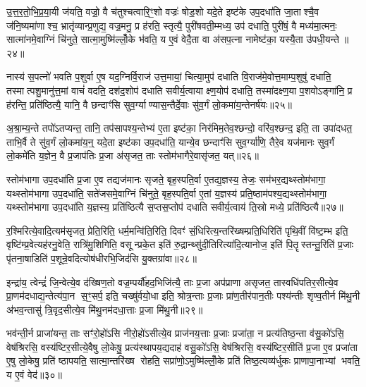 उ॒त्त॒र॒तो॒भि॒प्र॒या॒यी ज॑यति॒ वज्रो॒ वै च॑तुश्चत्वारि॒ꣳ॒शो वज्रः॑ षोड॒शो यदे॒ते इष्ट॑के उप॒दधा॑ति जा॒ताश्चै॒व ज॑नि॒ष्यमा॑णाश्च॒ भ्रातृ॑व्यान्प्र॒णुद्य॒ वज्र॒मनु॒ प्र ह॑रति॒ स्तृत्यै॒ पुरी॑षवती॒म्मध्य॒ उप॑ दधाति॒ पुरी॑षं॒ वै मध्य॑मा॒त्मनः॒ सात्मा॑नमे॒वाग्निं चि॑नुते॒ सात्मा॒मुष्मि॑ल्लोँ॒के भ॑वति॒ य ए॒वं वेदै॒ता वा अ॑सप॒त्ना नामेष्ट॑का॒ यस्यै॒ता उ॑पधी॒यन्ते॥२४॥

नास्य॑ स॒पत्नो॑ भवति प॒शुर्वा ए॒ष यद॒ग्निर्वि॒राज॑ उत्त॒मायां॒ चित्या॒मुप॑ दधाति वि॒राज॑मे॒वोत्त॒माम्प॒शुषु॑ दधाति॒ तस्मात्पशु॒मानु॑त्त॒मां वाचं॑ वदति॒ दश॑द॒शोप॑ दधाति सवीर्य॒त्वायाक्ष्ण॒योप॑ दधाति॒ तस्मा॑दक्ष्ण॒या प॒शवोऽङ्गा॑नि॒ प्र ह॑रन्ति॒ प्रति॑ष्ठित्यै॒ यानि॒ वै छन्दाꣳ॑सि सुव॒र्ग्याण्यास॒न्तैर्दे॒वाः सु॑व॒र्गं लो॒कमा॑य॒न्तेनर्\mbox{}ष॑यः॥२५॥

अ॒श्रा॒म्य॒न्ते तपो॑ऽतप्यन्त॒ तानि॒ तप॑सापश्य॒न्तेभ्य॑ ए॒ता इष्ट॑का॒ निर॑मिम॒तेव॒श्छन्दो॒ वरि॑व॒श्छन्द॒ इति॒ ता उपा॑दधत॒ ताभि॒र्वै ते सु॑व॒र्गं लो॒कमा॑य॒न्॒ यदे॒ता इष्ट॑का उप॒दधा॑ति॒ यान्ये॒व छन्दाꣳ॑सि सुव॒र्ग्या॑णि॒ तैरे॒व यज॑मानः सुव॒र्गं लो॒कमे॑ति य॒ज्ञेन॒ वै प्र॒जाप॑तिः प्र॒जा अ॑सृजत॒ ताः स्तोम॑भागैरे॒वासृ॑जत॒ यत्॥२६॥

स्तोम॑भागा उप॒दधा॑ति प्र॒जा ए॒व तद्यज॑मानः सृजते॒ बृह॒स्पति॒र्वा ए॒तद्य॒ज्ञस्य॒ तेजः॒ सम॑भर॒द्यथ्स्तोम॑भागा॒ यथ्स्तोम॑भागा उप॒दधा॑ति॒ सते॑जसमे॒वाग्निं चि॑नुते॒ बृह॒स्पति॒र्वा ए॒तां य॒ज्ञस्य॑ प्रति॒ष्ठाम॑पश्य॒द्यथ्स्तोम॑भागा॒ यथ्स्तोम॑भागा उप॒दधा॑ति य॒ज्ञस्य॒ प्रति॑ष्ठित्यै स॒प्तस॒प्तोप॑ दधाति सवीर्य॒त्वाय॑ ति॒स्रो मध्ये॒ प्रति॑ष्ठित्यै॥२७॥

{\anuvakamend[{उ॒त्त॒र॒तो ध॑त्ते॒ तस्मा॑दुपधी॒यन्त॒ ऋष॑योऽसृजत॒ यत्त्रिच॑त्वारिशच्च॥५॥}]}

र॒श्मिरित्ये॒वादि॒त्यम॑सृजत॒ प्रेति॒रिति॒ धर्म॒मन्वि॑ति॒रिति॒ दिवꣳ॑ सं॒धिरित्य॒न्तरि॑ख्षम्प्रति॒धिरिति॑ पृथि॒वीं वि॑ष्ट॒म्भ इति॒ वृष्टि॑म्प्र॒वेत्यह॑रनु॒वेति॒ रात्रि॑मु॒शिगिति॒ वसून्प्रके॒त इति॑ रु॒द्रान्थ्सु॑दी॒तिरित्या॑दि॒त्यानोज॒ इति॑ पि॒तॄस्तन्तु॒रिति॑ प्र॒जाः पृ॑तना॒षाडिति॑ प॒शून्रे॒वदित्योष॑धीरभि॒जिद॑सि यु॒क्तग्रा॑वा॥२८॥

इन्द्रा॑य॒ त्वेन्द्रं॑ जि॒न्वेत्ये॒व द॑ख्षिण॒तो वज्र॒म्पर्यौ॑हद॒भिजि॑त्यै॒ ताः प्र॒जा अप॑प्राणा असृजत॒ तास्वधि॑पतिर॒सीत्ये॒व प्रा॒णम॑दधाद्य॒न्तेत्य॑पा॒न स॒ꣳ॒सर्प॒ इति॒ चख्षु॑र्वयो॒धा इति॒ श्रोत्र॒न्ताः प्र॒जाः प्रा॑ण॒तीर॑पान॒तीः पश्य॑न्तीः शृण्व॒तीर्न मि॑थु॒नी अ॑भव॒न्तासु॑ त्रि॒वृद॒सीत्ये॒व मि॑थु॒नम॑दधा॒त्ताः प्र॒जा मि॑थु॒नी॥२९॥

भव॑न्ती॒र्न प्राजा॑यन्त॒ ताः सꣳ॑रो॒हो॑ऽसि नीरो॒हो॑ऽसीत्ये॒व प्राज॑नय॒त्ताः प्र॒जाः प्रजा॑ता॒ न प्रत्य॑तिष्ठ॒न्ता व॑सु॒को॑ऽसि॒ वेष॑श्रिरसि॒ वस्य॑ष्टिर॒सीत्ये॒वैषु लो॒केषु॒ प्रत्य॑स्थापय॒द्यदाह॑ वसु॒को॑ऽसि॒ वेष॑श्रिरसि॒ वस्य॑ष्टिर॒सीति॑ प्र॒जा ए॒व प्रजा॑ता ए॒षु लो॒केषु॒ प्रति॑ ष्ठापयति॒ सात्मा॒न्तरि॑ख्ष रोहति॒ सप्रा॑णो॒ऽमुष्मि॑ल्लोँ॒के प्रति॑ तिष्ठ॒त्यव्य॑र्धुकः प्राणापा॒नाभ्यां भवति॒ य ए॒वं वेद॑॥३०॥

